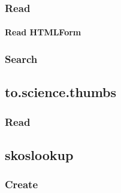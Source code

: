 \documentclass[letterpaper,10pt,english]{sphinxmanual}
\begin{document}
\subsubsection{Read}
\label{\detokenize{api-forms:read}}\label{\detokenize{api-forms:forms-read}}

\paragraph{Read HTML\sphinxhyphen{}Form}
\label{\detokenize{api-forms:read-html-form}}\label{\detokenize{api-forms:id3}}

\subsubsection{Search}
\label{\detokenize{api-forms:search}}\label{\detokenize{api-forms:forms-search}}

\subsection{to.science.thumbs}
\label{\detokenize{api-thumbs:to-science-thumbs}}\label{\detokenize{api-thumbs:id1}}\label{\detokenize{api-thumbs::doc}}
\sphinxAtStartPar
{}


\subsubsection{Read}
\label{\detokenize{api-thumbs:read}}\label{\detokenize{api-thumbs:read-5}}
\begin{sphinxVerbatim}[commandchars=\\\{\}]
  
\end{sphinxVerbatim}


\subsection{skos\sphinxhyphen{}lookup}
\label{\detokenize{api-skos:skos-lookup}}\label{\detokenize{api-skos:api-skos-lookup}}\label{\detokenize{api-skos::doc}}
\sphinxAtStartPar
{}


\subsubsection{Create}
\label{\detokenize{api-skos:create}}\label{\detokenize{api-skos:create-4}}
\end{document}
